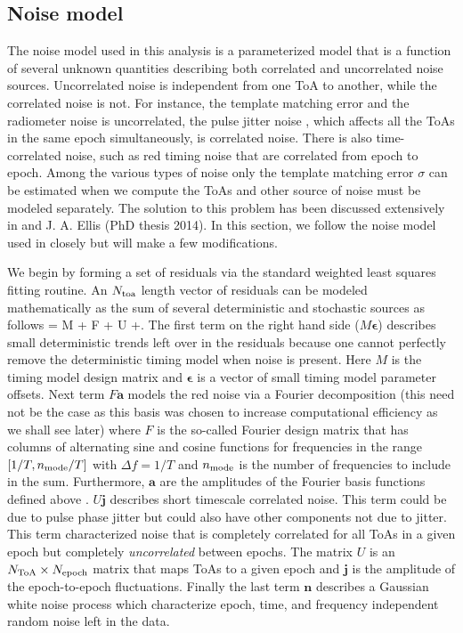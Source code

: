 \subsection{Noise model}
\label{sec:noise}
The noise model used in this analysis is a parameterized model that is a function of several unknown quantities describing both correlated and uncorrelated noise sources. Uncorrelated noise is 
independent from one ToA to another, while the correlated noise is not. 
For instance, the template matching error and the radiometer noise is
uncorrelated, the pulse jitter noise \citep{sc10}, which affects all the ToAs 
in the same epoch simultaneously, is correlated noise.
There is also time-correlated noise, such as red timing noise that are
correlated from epoch to epoch. Among the various types of noise only the
template matching error $\sigma$ can be estimated when we compute the ToAs and 
other source of noise must be modeled separately. The solution to this problem has been discussed extensively in \citet{vl13, ell13, vv14a, vv14, abb+14} and J. A. Ellis (PhD thesis 2014). In this section, we follow the noise model used in \citet{abb+14} closely but will make a few modifications.

We begin by forming a set of residuals via the standard weighted least squares fitting routine. An $N_{\rm toa}$ length vector of  residuals can be modeled mathematically as the sum of several deterministic and stochastic sources as follows
\be
\delta{} = M\boldsymbol{\epsilon} + F + U +.
\ee
The first term on the right hand side ($M\boldsymbol{\epsilon}$) describes small deterministic trends
left over in the residuals because one cannot perfectly remove the
deterministic timing model when noise is present. Here $M$ is the timing model
design matrix and $\boldsymbol{\epsilon}$ is a vector of small timing model
parameter offsets. Next term $F\mathbf{a}$ models the red noise via a Fourier decomposition
(this need not be the case as this basis was chosen to increase computational
efficiency as we shall see later) where $F$ is the so-called Fourier design
matrix that has columns of alternating sine and cosine functions for
frequencies in the range $[1/T,n_{\rm mode}/T]$ with $\Delta f=1/T$ and
$n_{\rm mode}$ is the number of frequencies to include in the sum.
Furthermore, $\mathbf{a}$ are the amplitudes of the Fourier basis functions
defined above \citep[see][for more details]{lah+13,abb+14}. 
$U\mathbf{j}$ describes short timescale correlated noise. This term could be due to pulse
phase jitter but could also have other components not due to jitter. This term
characterized noise that is completely correlated for all ToAs in a given
epoch but completely \emph{uncorrelated} between epochs. The matrix $U$ is an
$N_{\rm ToA}\times N_{\rm epoch}$ matrix that maps ToAs to a given epoch and
$\mathbf{j}$ is the amplitude of the epoch-to-epoch fluctuations. Finally the
last term $\mathbf{n}$ describes a Gaussian white noise process which characterize
epoch, time, and frequency independent random noise left in the data. %

